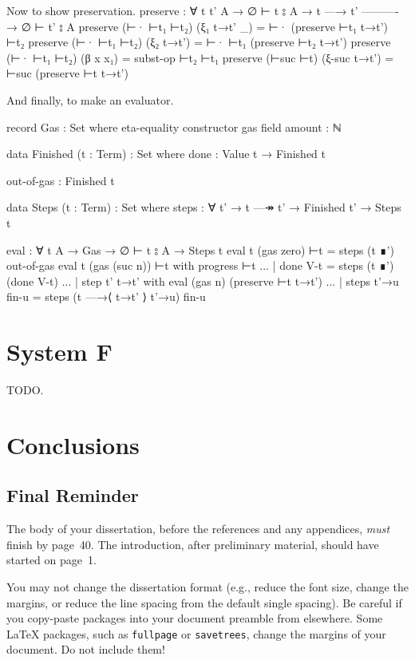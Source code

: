 \documentclass[logo,bsc,singlespacing,parskip,online]{infthesis}
\renewenvironment{code}{\mintedcopy[breaklines,breaksymbolleft=\;]{agda}}{\endmintedcopy}
\begin{document}
Now to show preservation.
\begin{code}
preserve : ∀ {t t' A}
  → ∅ ⊢ t ⦂ A
  → t —→ t'
    ----------
  → ∅ ⊢ t' ⦂ A
preserve (⊢· ⊢t₁ ⊢t₂) (ξ₁ t→t' _) = ⊢· (preserve ⊢t₁ t→t') ⊢t₂
preserve (⊢· ⊢t₁ ⊢t₂) (ξ₂ t→t') = ⊢· ⊢t₁  (preserve ⊢t₂ t→t')
preserve (⊢· ⊢t₁ ⊢t₂) (β x x₁) = subst-op ⊢t₂ ⊢t₁
preserve (⊢suc ⊢t) (ξ-suc t→t') = ⊢suc (preserve ⊢t t→t')
\end{code}

And finally, to make an evaluator.

\begin{code}
record Gas : Set where
  eta-equality
  constructor gas
  field
    amount : ℕ

data Finished (t : Term) : Set where
  done :
      Value t
    → Finished t

  out-of-gas :
    Finished t

data Steps (t : Term) : Set where
  steps : ∀ {t'}
    → t —↠ t'
    → Finished t'
    → Steps t

eval : ∀ {t A}
  → Gas
  → ∅ ⊢ t ⦂ A
  → Steps t
eval {t} (gas zero) ⊢t = steps (t ∎') out-of-gas
eval {t} (gas (suc n)) ⊢t with progress ⊢t
... | done V-t = steps (t ∎') (done V-t)
... | step {t'} t→t' with eval (gas n) (preserve ⊢t t→t')
...   | steps t'→u fin-u = steps (t —→⟨ t→t' ⟩ t'→u) fin-u
\end{code}

\chapter{System F}
TODO.

\chapter{Conclusions}

\section{Final Reminder}

The body of your dissertation, before the references and any appendices,
\emph{must} finish by page~40. The introduction, after preliminary material,
should have started on page~1.

You may not change the dissertation format (e.g., reduce the font size, change
the margins, or reduce the line spacing from the default single spacing). Be
careful if you copy-paste packages into your document preamble from elsewhere.
Some \LaTeX{} packages, such as \texttt{fullpage} or \texttt{savetrees}, change
the margins of your document. Do not include them!
\end{document}

